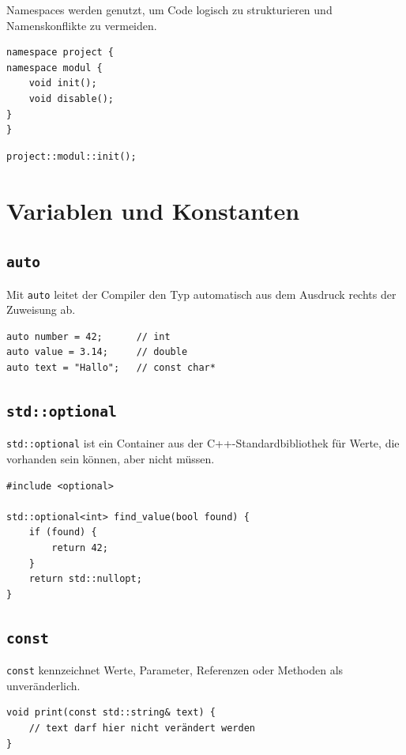 \documentclass[11pt,a4paper]{article}
\newcommand{\code}[1]{\texttt{#1}}
\begin{document}
Namespaces werden genutzt, um Code logisch zu strukturieren und Namenskonflikte zu vermeiden.

\begin{lstlisting}[caption={Namespace-Struktur}]
namespace project {
namespace modul {
    void init();
    void disable();
}
}
\end{lstlisting}

\begin{lstlisting}[caption={Aufruf einer Funktion im Namespace}]
project::modul::init();
\end{lstlisting}

\section{Variablen und Konstanten}

\subsection{\code{auto}}
Mit \code{auto} leitet der Compiler den Typ automatisch aus dem Ausdruck rechts der Zuweisung ab.

\begin{lstlisting}[caption={Typableitung mit auto}]
auto number = 42;      // int
auto value = 3.14;     // double
auto text = "Hallo";   // const char*
\end{lstlisting}

\subsection{\code{std::optional}}
\code{std::optional} ist ein Container aus der C++-Standardbibliothek für Werte, die vorhanden sein können, aber nicht müssen.

\begin{lstlisting}[caption={Optionaler Rückgabewert}]
#include <optional>

std::optional<int> find_value(bool found) {
    if (found) {
        return 42;
    }
    return std::nullopt;
}
\end{lstlisting}

\subsection{\code{const}}
\code{const} kennzeichnet Werte, Parameter, Referenzen oder Methoden als unveränderlich.

\begin{lstlisting}[caption={Konstante Referenz als Funktionsparameter}]
void print(const std::string& text) {
    // text darf hier nicht verändert werden
}
\end{lstlisting}
\end{document}
